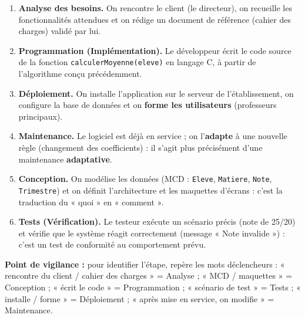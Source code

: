 \documentclass[11pt]{article}
\begin{document}
\begin{corrige}
\begin{enumerate}
    \item \textbf{Analyse des besoins.} On rencontre le client (le directeur), on recueille les fonctionnalités attendues et on rédige un document de référence (cahier des charges) validé par lui.
    \item \textbf{Programmation (Implémentation).} Le développeur écrit le code source de la fonction \texttt{calculerMoyenne(eleve)} en langage C, à partir de l'algorithme conçu précédemment.
    \item \textbf{Déploiement.} On installe l'application sur le serveur de l'établissement, on configure la base de données et on \textbf{forme les utilisateurs} (professeurs principaux).
    \item \textbf{Maintenance.} Le logiciel est déjà en service ; on l'\textbf{adapte} à une nouvelle règle (changement des coefficients) : il s'agit plus précisément d'une maintenance \textbf{adaptative}.
    \item \textbf{Conception.} On modélise les données (MCD : \texttt{Eleve}, \texttt{Matiere}, \texttt{Note}, \texttt{Trimestre}) et on définit l'architecture et les maquettes d'écrans : c'est la traduction du « quoi » en « comment ».
    \item \textbf{Tests (Vérification).} Le testeur exécute un scénario précis (note de 25/20) et vérifie que le système réagit correctement (message « Note invalide ») : c'est un test de conformité au comportement prévu.
\end{enumerate}
\textbf{Point de vigilance :} pour identifier l'étape, repère les mots déclencheurs : « rencontre du client / cahier des charges » = Analyse ; « MCD / maquettes » = Conception ; « écrit le code » = Programmation ; « scénario de test » = Tests ; « installe / forme » = Déploiement ; « après mise en service, on modifie » = Maintenance.
\end{corrige}
\end{document}
